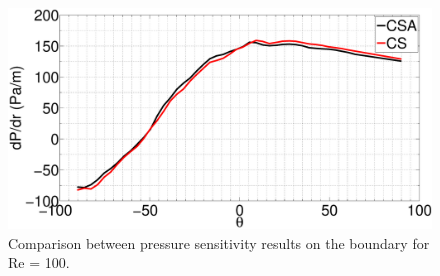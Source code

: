 \begin{figure}[H]
    \centering
    \includegraphics[width=12.00cm]{Chapter_4/figure/flow_over_cylinder/pressureSensitivityOnBoundary_RE100.eps}
    \caption{Comparison between pressure sensitivity results on the boundary for Re = 100.}
    \label{fig:C4_flowOverCylidner_pressureSensitivityOnSurface}
\end{figure}